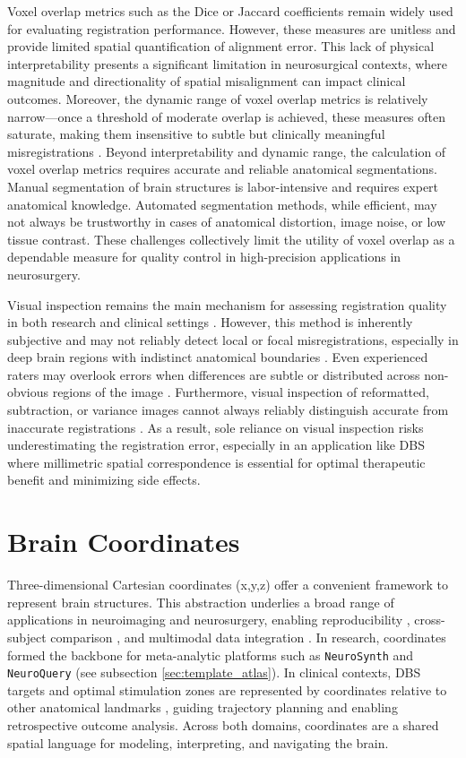 Voxel overlap metrics such as the Dice or Jaccard coefficients remain widely used for evaluating registration performance. However, these measures are unitless and provide limited spatial quantification of alignment error. This lack of physical interpretability presents a significant limitation in neurosurgical contexts, where magnitude and directionality of spatial misalignment can impact clinical outcomes. Moreover, the dynamic range of voxel overlap metrics is relatively narrow—once a threshold of moderate overlap is achieved, these measures often saturate, making them insensitive to subtle but clinically meaningful misregistrations \cite{Lau2019-eh}. Beyond interpretability and dynamic range, the calculation of voxel overlap metrics requires accurate and reliable anatomical segmentations. Manual segmentation of brain structures is labor-intensive and requires expert anatomical knowledge. Automated segmentation methods, while efficient, may not always be trustworthy in cases of anatomical distortion, image noise, or low tissue contrast. These challenges collectively limit the utility of voxel overlap as a dependable measure for quality control in high-precision applications in neurosurgery.

Visual inspection remains the main mechanism for assessing registration quality in both research and clinical settings \cite{Neudorfer2023-wd,Esteban2019-oz}. However, this method is inherently subjective and may not reliably detect local or focal misregistrations, especially in deep brain regions with indistinct anatomical boundaries \cite{Bosma2024-cf,Rohlfing2012-kt}. Even experienced raters may overlook errors when differences are subtle or distributed across non-obvious regions of the image \cite{de-Senneville2020-am}. Furthermore, visual inspection of reformatted, subtraction, or variance images cannot always reliably distinguish accurate from inaccurate registrations \cite{Rohlfing2012-kt}. As a result, sole reliance on visual inspection risks underestimating the registration error, especially in an application like DBS where millimetric spatial correspondence is essential for optimal therapeutic benefit and minimizing side effects.

\section{Brain Coordinates} 
Three-dimensional Cartesian coordinates (x,y,z) offer a convenient framework to represent brain structures. This abstraction underlies a broad range of applications in neuroimaging and neurosurgery, enabling reproducibility \cite{Dockes2020-nw}, cross-subject comparison \cite{Glasser2016-ko}, and multimodal data integration \cite{Uludag2014-qz}. In research, coordinates formed the backbone for meta-analytic platforms such as \texttt{NeuroSynth} and \texttt{NeuroQuery} (see subsection \ref{sec:template_atlas}). In clinical contexts, DBS targets and optimal stimulation zones are represented by coordinates relative to other anatomical landmarks \cite{Horn2017-bi}, guiding trajectory planning and enabling retrospective outcome analysis. Across both domains, coordinates are a shared spatial language for modeling, interpreting, and navigating the brain.

